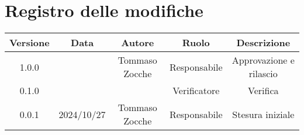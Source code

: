 
\section*{Registro delle modifiche}
\begin{table}[H]
    \begin{tabular}{|c|c|c|c|c|}
        \hline
         \textbf{Versione} &  \textbf{Data} &  \textbf{Autore} &  \textbf{Ruolo} & \textbf{Descrizione} \\
          \hline
         1.0.0&  & Tommaso Zocche & Responsabile & Approvazione e rilascio\\
         \hline
         0.1.0 &   &   & Verificatore & Verifica \\
         \hline
         0.0.1 &  2024/10/27 & Tommaso Zocche &  Responsabile & Stesura iniziale \\
         \hline
    \end{tabular}
\end{table}